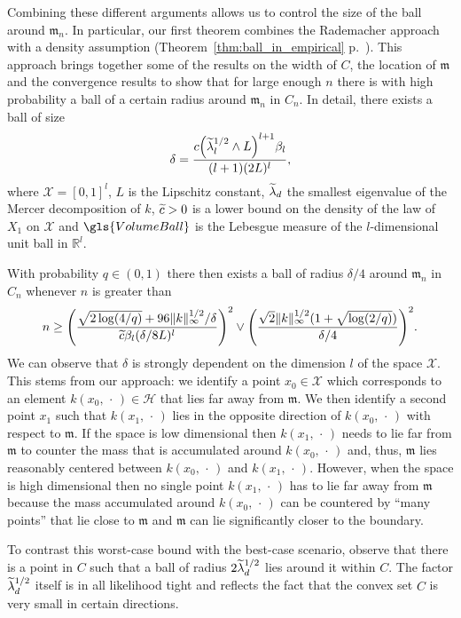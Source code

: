 \documentclass[AHL,Unicode,longabstracts,published]{cedram}
\theoremstyle{remark}
\newcommand{\R}{\mathbb{R}}
\newcommand{\X}{\mathcal{X}}
\newcommand{\cH}{\mathcal{H}}
\newcommand{\mean}{\mathfrak{m}}
\let\oldtilde\tilde
\renewcommand*{\tilde}[1]{\mathchoice{\widetilde{#1}}{\widetilde{#1}}{\oldtilde{#1}}{\oldtilde{#1}}}
\let\originalleft\left
\let\originalright\right
\renewcommand{\left}{\mathopen{}\mathclose\bgroup\originalleft}
\renewcommand{\right}{\aftergroup\egroup\originalright}
\begin{document}
Combining these different arguments allows us to control the size of the ball around $\mean_n$. In particular, our first theorem combines the Rademacher approach with a density assumption (Theorem~\ref{thm:ball_in_empirical} p.~\pageref{thm:ball_in_empirical}). This approach brings together some of the results on the width of $C$, the location of $\mean$ and the convergence results to show that for large enough $n$ there is with high probability a ball of a certain radius around $\mean_n$ in $C_n$. In detail, there exists a ball of size
\[
\delta = \frac{c\left(\tilde \lambda_l^{1/2} \wedge L\right)^{l+1}\beta_l}{(l+1) (2L)^l},
\]
where $\X = [0,1]^l$, $L$ is the Lipschitz constant, $\tilde \lambda_d$ the smallest eigenvalue of the Mercer decomposition of $k$, $\tilde c > 0$ is a lower bound on the density of the law of $X_1$ on $\X$ and $\gls{VolumeBall}$ is the Lebesgue measure of the $l$-dimensional unit ball in $\R^l$.

With probability $q\in (0,1)$ there then exists a ball of radius $\delta/4$ around $\mean_n$ in $C_n$ whenever $n$ is greater than
\[
n \geq \left(\frac{\sqrt{2\log(4/q)} + 96 \|k\|_\infty^{1/2}/\delta}{\tilde c\beta_l(\delta/8L)^l}\right)^{2} \vee
\left(\frac{\sqrt{2} \|k\|^{1/2}_\infty (1 + \sqrt{\log(2/q)})}{\delta/4}\right)^{2}.
\]
We can observe that $\delta$ is strongly dependent on the dimension $l$ of the space $\X$. This stems from our approach: we identify a point $x_0 \in \X$ which corresponds to an element $k(x_0,\,\cdot\,) \in \cH$ that lies far away from $\mean$. We then identify a second point $x_1$ such that $k(x_1,\,\cdot\,)$ lies in the opposite direction of $k(x_0,\,\cdot\,)$ with respect to $\mean$. If the space is low dimensional then $k(x_1,\,\cdot\,)$ needs to lie far from $\mean$ to counter the mass that is accumulated around $k(x_0,\,\cdot\,)$ and, thus, $\mean$ lies reasonably centered between $k(x_0,\,\cdot\,)$ and $k(x_1,\,\cdot\,)$. However, when the space is high dimensional then no single point $k(x_1,\,\cdot\,)$ has to lie far away from $\mean$ because the mass accumulated around $k(x_0,\,\cdot\,)$ can be countered by ``many points'' that lie close to $\mean$ and $\mean$ can lie significantly closer to the boundary.

To contrast this worst-case bound with the best-case scenario, observe that there is a point in $C$ such that a ball of radius $2\tilde \lambda_d^{1/2}$ lies around it within $C$. The factor $\tilde \lambda_d^{1/2}$ itself is in all likelihood tight and reflects the fact that the convex set $C$ is very small in certain directions.
\end{document}
